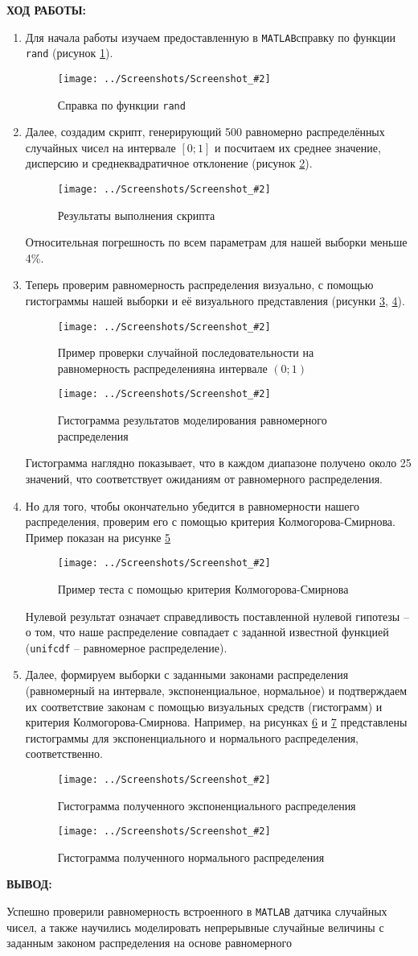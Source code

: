 \documentclass[14pt,a4paper]{extreport}
\newcommand{\screenshot}[2]{\begin{figure}[ht]%
\centering\texttt{[image: ../Screenshots/Screenshot\_\#2]}%
\caption{#1}%
\label{picture#2}%
\end{figure}%
}
\newcommand{\header}[1]{%
{
\clearpage%
\fontsize{16pt}{14pt}\selectfont
\begin{center}
\textbf{\MakeUppercase{#1}:}
\end{center}
}
}
\newcommand{\matlab}{\texttt{\MakeUppercase{matlab}}}
\begin{document}
\header{Ход работы}

\begin{enumerate}

\item Для начала работы изучаем предоставленную в \matlab справку по функции \texttt{rand} (рисунок \ref{picture1}).

\screenshot{Справка по функции \texttt{rand}}{1}

\item Далее, создадим скрипт, генерирующий 500 равномерно распределённых случайных чисел на интервале $[0; 1]$ и посчитаем их среднее значение, дисперсию и среднеквадратичное отклонение (рисунок \ref{picture2}).

\screenshot{Результаты выполнения скрипта}{2}

Относительная погрешность по всем параметрам для нашей выборки меньше 4\%.

\item Теперь проверим равномерность распределения визуально, с помощью гистограммы нашей выборки и её визуального представления (рисунки \ref{picture3}, \ref{picture4}).

\screenshot{{Пример проверки случайной последовательности на равномерность распределенияна интервале $(0; 1)$}}{3}

\screenshot{Гистограмма результатов моделирования равномерного распределения}{4}

Гистограмма наглядно показывает, что в каждом диапазоне получено около 25 значений, что соответствует ожиданиям от равномерного распределения.

\item Но для того, чтобы окончательно убедится в равномерности нашего распределения, проверим его с помощью критерия Колмогорова-Смирнова. Пример показан на рисунке \ref{picture5}

\screenshot{Пример теста с помощью критерия Колмогорова-Смирнова}{5}

Нулевой результат означает справедливость поставленной нулевой гипотезы – о том, что наше распределение совпадает с заданной известной функцией (\texttt{unifcdf} {} – равномерное распределение).

\item Далее, формируем выборки с заданными законами распределения (равномерный на интервале, экспоненциальное, нормальное) и подтверждаем их соответствие законам с помощью визуальных средств (гистограмм) и критерия Колмогорова-Смирнова. Например, на рисунках \ref{picture6} и \ref{picture7} представлены гистограммы для экспоненциального и нормального распределения, соответственно.

\screenshot{Гистограмма полученного экспоненциального распределения}{6}

\screenshot{Гистограмма полученного нормального распределения}{7}

\end{enumerate}

\header{Вывод}

Успешно проверили равномерность встроенного в \matlab {} датчика случайных чисел, а также научились моделировать непрерывные случайные величины с заданным законом распределения на основе равномерного
\end{document}
